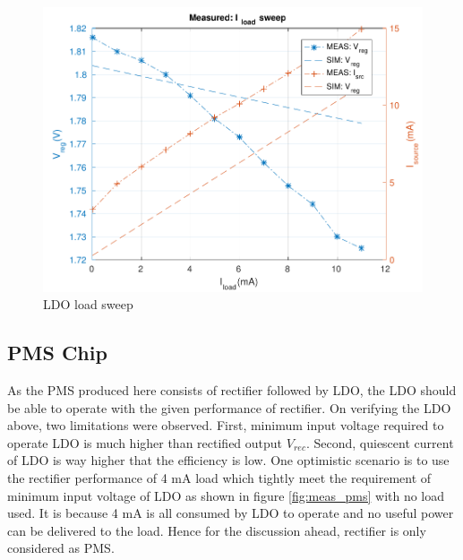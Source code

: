\documentclass[UKenglish]{ifimaster}  %
\begin{document}
\begin{figure} [H]
  \centering
  \includegraphics[width=\textwidth]{img/meas/ldo_iload_sweep.pdf} 
 \caption{LDO load sweep} 
\label{fig:meas_ldo_iload_sweep} 
\end{figure}



\subsection{PMS Chip} %

As the PMS produced here consists of rectifier followed by LDO, the LDO should be able to operate with the given performance of rectifier. On verifying the LDO above, two limitations were observed. First, minimum input voltage required to operate LDO is much higher than rectified output $V_{rec}$. Second, quiescent current of LDO is way higher that the efficiency is low. One optimistic scenario is to use the rectifier performance of 4 mA load which tightly meet the requirement of minimum input voltage 
of LDO as shown in figure  \ref{fig:meas_pms} with no load used. It is because 4 mA is all consumed by LDO to operate and no useful power can be delivered to the load. Hence for the discussion ahead, rectifier is only considered as PMS. \\
\end{document}
